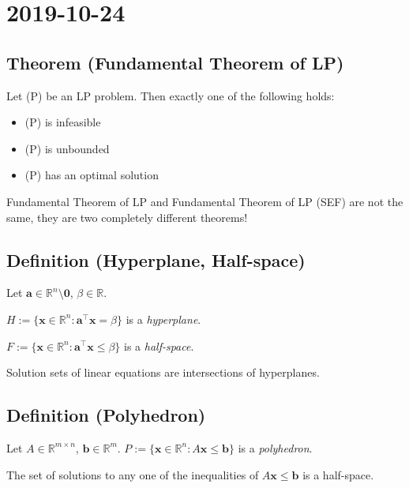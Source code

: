 \section{2019-10-24}
\begin{thmbox}
    \subsection{Theorem (Fundamental Theorem of LP)}
    Let (P) be an LP problem. Then exactly one of the following holds:
    \begin{itemize}
        \item (P) is infeasible
        \item (P) is unbounded
        \item (P) has an optimal solution
    \end{itemize}
\end{thmbox}
\begin{remark}
    Fundamental Theorem of LP and Fundamental Theorem of LP (SEF) are not
    the same, they are two completely different theorems!
\end{remark}

\begin{defbox}
    \subsection{Definition (Hyperplane, Half-space)}
    Let $ \bm{a} \in \mathbb{R}^n\setminus{\bm{0}} $, $ \beta \in\mathbb{R} $.

    $ H:=\{\bm{x}\in\mathbb{R}^n:
    \bm{a} ^\top \bm{x}=\beta \} $ is a \emph{hyperplane}.

    $ F:=\{\bm{x}\in\mathbb{R}^n:
    \bm{a} ^\top \bm{x}\le \beta\} $ is a \emph{half-space}.
\end{defbox}

Solution sets of linear equations are intersections of hyperplanes.

\begin{defbox}
    \subsection{Definition (Polyhedron)}
    Let $ A\in \mathbb{R}^{m \times n} $, $ \bm{b}\in \mathbb{R}^m $.
    $ P:=\{\bm{x}\in\mathbb{R}^n:A\bm{x}\le \bm{b}\} $ is a \emph{polyhedron}.
\end{defbox}
\begin{remark}
    The set of solutions to any one of the inequalities of 
    $ A\bm{x}\le \bm{b} $ is a half-space.
\end{remark}

